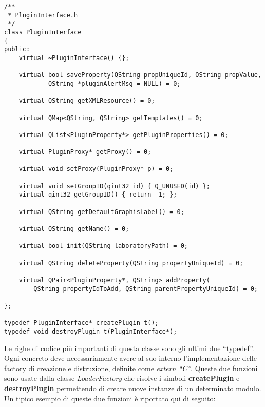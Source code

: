 \begin{lstlisting}
/**
 * PluginInterface.h
 */
class PluginInterface
{
public:
	virtual ~PluginInterface() {};

	virtual bool saveProperty(QString propUniqueId, QString propValue,
			QString *pluginAlertMsg = NULL) = 0;

	virtual QString getXMLResource() = 0;

	virtual QMap<QString, QString> getTemplates() = 0;
	
	virtual QList<PluginProperty*> getPluginProperties() = 0;

	virtual PluginProxy* getProxy() = 0;

	virtual void setProxy(PluginProxy* p) = 0;

	virtual void setGroupID(qint32 id) { Q_UNUSED(id) };
	virtual qint32 getGroupID() { return -1; };

	virtual QString getDefaultGraphisLabel() = 0;

	virtual QString getName() = 0;

	virtual bool init(QString laboratoryPath) = 0;
	
	virtual QString deleteProperty(QString propertyUniqueId) = 0;
	
	virtual QPair<PluginProperty*, QString> addProperty(
		QString propertyIdToAdd, QString parentPropertyUniqueId) = 0;
	
};

typedef PluginInterface* createPlugin_t();
typedef void destroyPlugin_t(PluginInterface*);
\end{lstlisting}
Le righe di codice più importanti di questa classe sono gli ultimi due ``typedef''. Ogni \plugin{} concreto deve necessariamente avere al suo interno l'implementazione delle factory di creazione e distruzione, definite come \emph{extern ``C''}. Queste due funzioni sono usate dalla classe \emph{LoaderFactory} che risolve i simboli \textbf{createPlugin} e \textbf{destroyPlugin} permettendo di creare nuove instanze di un determinato modulo. Un tipico esempio di queste due funzioni è riportato qui di seguito:

